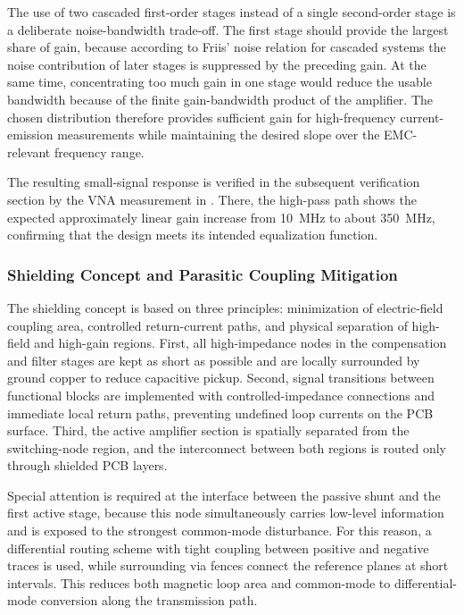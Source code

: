 The use of two cascaded first-order stages instead of a single second-order stage is a deliberate noise-bandwidth trade-off.
The first stage should provide the largest share of gain, because according to Friis' noise relation for cascaded systems the noise contribution of later stages is suppressed by the preceding gain.
At the same time, concentrating too much gain in one stage would reduce the usable bandwidth because of the finite gain-bandwidth product of the amplifier.
The chosen distribution therefore provides sufficient gain for high-frequency current-emission measurements while maintaining the desired slope over the EMC-relevant frequency range.

The resulting small-signal response is verified in the subsequent verification section by the VNA measurement in .
There, the high-pass path shows the expected approximately linear gain increase from \SI{10}{MHz} to about \SI{350}{MHz}, confirming that the design meets its intended equalization function.


\subsubsection*{Shielding Concept and Parasitic Coupling Mitigation}

The shielding concept is based on three principles: minimization of electric-field coupling area, controlled return-current paths, and physical separation of high-field and high-gain regions.
First, all high-impedance nodes in the compensation and filter stages are kept as short as possible and are locally surrounded by ground copper to reduce capacitive pickup.
Second, signal transitions between functional blocks are implemented with controlled-impedance connections and immediate local return paths, preventing undefined loop currents on the PCB surface.
Third, the active amplifier section is spatially separated from the switching-node region, and the interconnect between both regions is routed only through shielded PCB layers.

Special attention is required at the interface between the passive shunt and the first active stage, because this node simultaneously carries low-level information and is exposed to the strongest common-mode disturbance.
For this reason, a differential routing scheme with tight coupling between positive and negative traces is used, while surrounding via fences connect the reference planes at short intervals.
This reduces both magnetic loop area and common-mode to differential-mode conversion along the transmission path.


